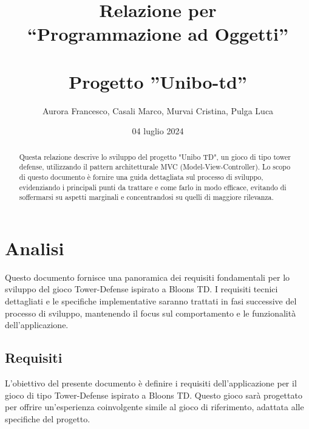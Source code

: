 \documentclass[a4paper,12pt]{report}
\title{Relazione per \\``Programmazione ad Oggetti'' \\ \\Progetto ''Unibo-td''}
\author{Aurora Francesco, Casali Marco, Murvai Cristina, Pulga Luca}
\date{04 luglio 2024}
\begin{document}
\maketitle

\begin{abstract}
Questa relazione descrive lo sviluppo del progetto "Unibo TD", un gioco di tipo tower defense, utilizzando il pattern architetturale MVC (Model-View-Controller). Lo scopo di questo documento è fornire una guida dettagliata sul processo di sviluppo, evidenziando i principali punti da trattare e come farlo in modo efficace, evitando di soffermarsi su aspetti marginali e concentrandosi su quelli di maggiore rilevanza.

\end{abstract}

\tableofcontents

\chapter{Analisi}

Questo documento fornisce una panoramica dei requisiti fondamentali per lo sviluppo del gioco Tower-Defense ispirato a Bloons TD. I requisiti tecnici dettagliati e le specifiche implementative saranno trattati in fasi successive del processo di sviluppo, mantenendo il focus sul comportamento e le funzionalità dell'applicazione.

\section{Requisiti}

L'obiettivo del presente documento è definire i requisiti dell'applicazione per il gioco di tipo Tower-Defense ispirato a Bloons TD. Questo gioco sarà progettato per offrire un'esperienza coinvolgente simile al gioco di riferimento, adattata alle specifiche del progetto.
\end{document}
